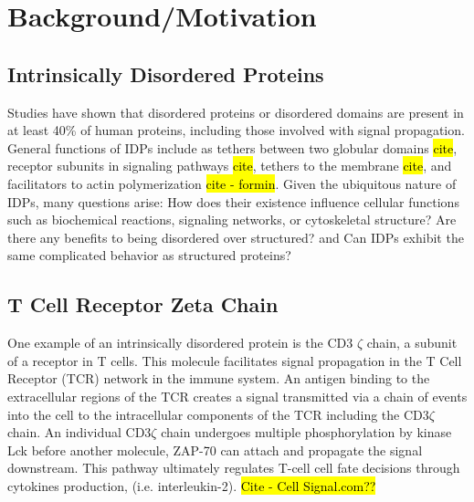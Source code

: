 \documentclass[../AdvancementSummary.tex]{subfiles}
\begin{document}
\section{Background/Motivation}

\subsection{Intrinsically Disordered Proteins}

Studies have shown that disordered proteins or disordered domains are present in at least 40\% of human proteins, including those involved with signal propagation.\cite{Tompa2012} General functions of IDPs include as tethers between two globular domains \hl{cite}, receptor subunits in signaling pathways \hl{cite}, tethers to the membrane \hl{cite}, and facilitators to actin polymerization \hl{cite - formin}. Given the ubiquitous nature of IDPs, many questions arise: How does their existence influence cellular functions such as biochemical reactions, signaling networks, or cytoskeletal structure?  Are there any benefits to being disordered over structured? and Can IDPs exhibit the same complicated behavior as structured proteins?



\subsection{T Cell Receptor Zeta Chain}

One example of an intrinsically disordered protein is the CD3 $\zeta$ chain, a subunit of a receptor in T cells. This molecule facilitates signal propagation in the T Cell Receptor (TCR) network in the immune system.  An antigen binding to the extracellular regions of the TCR creates a signal transmitted via a chain of events into the cell to the intracellular components of the TCR including the CD3$\zeta$ chain.  An individual CD3$\zeta$ chain undergoes multiple phosphorylation by kinase Lck before another molecule, ZAP-70 can attach and propagate the signal downstream. This pathway ultimately regulates T-cell cell fate decisions through cytokines production, (i.e. interleukin-2). \hl{Cite - Cell Signal.com??} 
\end{document}
